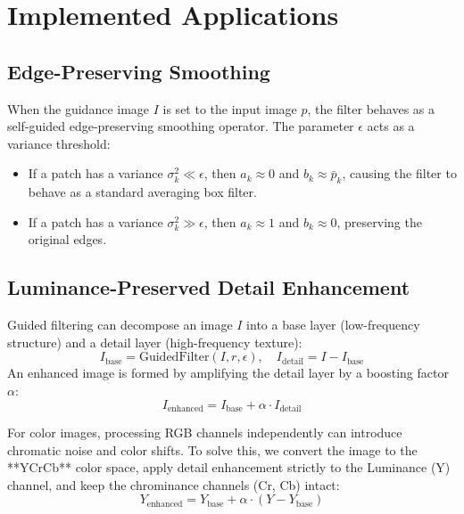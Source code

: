 \documentclass[11pt,a4paper]{article}
\begin{document}
\section{Implemented Applications}

\subsection{Edge-Preserving Smoothing}
When the guidance image $I$ is set to the input image $p$, the filter behaves as a self-guided edge-preserving smoothing operator. The parameter $\epsilon$ acts as a variance threshold:
\begin{itemize}
    \item If a patch has a variance $\sigma_k^2 \ll \epsilon$, then $a_k \approx 0$ and $b_k \approx \bar{p}_k$, causing the filter to behave as a standard averaging box filter.
    \item If a patch has a variance $\sigma_k^2 \gg \epsilon$, then $a_k \approx 1$ and $b_k \approx 0$, preserving the original edges.
\end{itemize}

\subsection{Luminance-Preserved Detail Enhancement}
Guided filtering can decompose an image $I$ into a base layer (low-frequency structure) and a detail layer (high-frequency texture):
\begin{equation}
    I_{\text{base}} = \text{GuidedFilter}(I, r, \epsilon), \quad I_{\text{detail}} = I - I_{\text{base}}
\end{equation}
An enhanced image is formed by amplifying the detail layer by a boosting factor $\alpha$:
\begin{equation}
    I_{\text{enhanced}} = I_{\text{base}} + \alpha \cdot I_{\text{detail}}
\end{equation}

For color images, processing RGB channels independently can introduce chromatic noise and color shifts. To solve this, we convert the image to the **YCrCb** color space, apply detail enhancement strictly to the Luminance (Y) channel, and keep the chrominance channels (Cr, Cb) intact:
\begin{equation}
    Y_{\text{enhanced}} = Y_{\text{base}} + \alpha \cdot (Y - Y_{\text{base}})
\end{equation}
\end{document}
